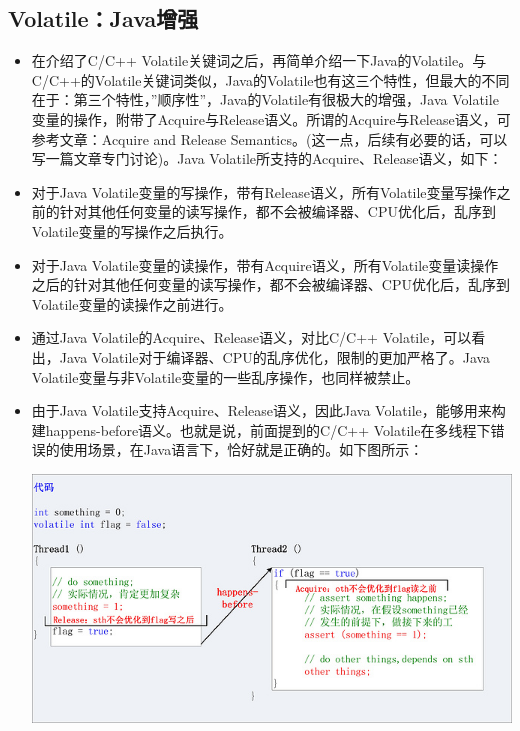 \documentclass[9pt,b5paper]{article}
\begin{document}
\subsection{Volatile：Java增强}
\label{sec-9-4}
\begin{itemize}
\item 在介绍了C/C++ Volatile关键词之后，再简单介绍一下Java的Volatile。与C/C++的Volatile关键词类似，Java的Volatile也有这三个特性，但最大的不同在于：第三个特性，”顺序性”，Java的Volatile有很极大的增强，Java Volatile变量的操作，附带了Acquire与Release语义。所谓的Acquire与Release语义，可参考文章：Acquire and Release Semantics。(这一点，后续有必要的话，可以写一篇文章专门讨论)。Java Volatile所支持的Acquire、Release语义，如下：
\item 对于Java Volatile变量的写操作，带有Release语义，所有Volatile变量写操作之前的针对其他任何变量的读写操作，都不会被编译器、CPU优化后，乱序到Volatile变量的写操作之后执行。
\item 对于Java Volatile变量的读操作，带有Acquire语义，所有Volatile变量读操作之后的针对其他任何变量的读写操作，都不会被编译器、CPU优化后，乱序到Volatile变量的读操作之前进行。
\item 通过Java Volatile的Acquire、Release语义，对比C/C++ Volatile，可以看出，Java Volatile对于编译器、CPU的乱序优化，限制的更加严格了。Java Volatile变量与非Volatile变量的一些乱序操作，也同样被禁止。
\item 由于Java Volatile支持Acquire、Release语义，因此Java Volatile，能够用来构建happens-before语义。也就是说，前面提到的C/C++ Volatile在多线程下错误的使用场景，在Java语言下，恰好就是正确的。如下图所示：

\includegraphics[width=.9\linewidth]{../pic/v12.jpg}
\end{itemize}
\end{document}
